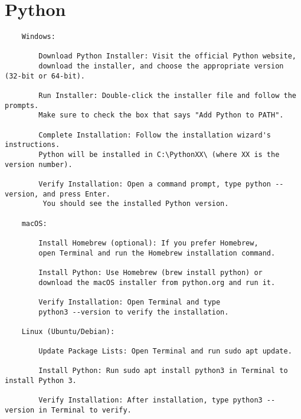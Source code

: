 \documentclass{report}
\begin{document}
\pagebreak

\setcounter{chapter}{1}
\setcounter{section}{0}
\section{Python}


\sol{}

\begin{verbatim}
	Windows:

		Download Python Installer: Visit the official Python website, 
		download the installer, and choose the appropriate version (32-bit or 64-bit).

		Run Installer: Double-click the installer file and follow the prompts. 
		Make sure to check the box that says "Add Python to PATH".

		Complete Installation: Follow the installation wizard's instructions. 
		Python will be installed in C:\PythonXX\ (where XX is the version number).

		Verify Installation: Open a command prompt, type python --version, and press Enter.
		 You should see the installed Python version.

	macOS:

		Install Homebrew (optional): If you prefer Homebrew, 
		open Terminal and run the Homebrew installation command.

		Install Python: Use Homebrew (brew install python) or 
		download the macOS installer from python.org and run it.

		Verify Installation: Open Terminal and type 
		python3 --version to verify the installation.

	Linux (Ubuntu/Debian):

		Update Package Lists: Open Terminal and run sudo apt update.

		Install Python: Run sudo apt install python3 in Terminal to install Python 3.

		Verify Installation: After installation, type python3 --version in Terminal to verify.

\end{verbatim}

\bigskip


\sol{}
\end{document}
